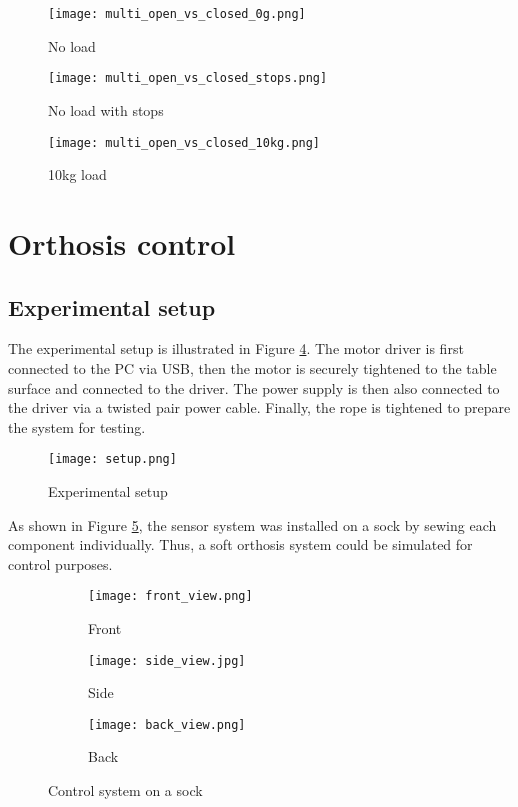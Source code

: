 \begin{figure}[htbp]
  \centering
  \texttt{[image: multi\_open\_vs\_closed\_0g.png]}
  \caption{No load}
  \label{fig:movc0g}
\end{figure}
\begin{figure}[htbp]
  \centering
  \texttt{[image: multi\_open\_vs\_closed\_stops.png]}
  \caption{No load with stops}
  \label{fig:movcstops}
\end{figure}
\begin{figure}[htbp]
  \centering
  \texttt{[image: multi\_open\_vs\_closed\_10kg.png]}
  \caption{10kg load}
  \label{fig:movc10kg}
\end{figure}
\FloatBarrier

\section{Orthosis control}
\subsection{Experimental setup}
The experimental setup is illustrated in Figure \ref{fig:setup}. The motor driver 
is first connected to the PC via USB, then the motor is securely tightened to the 
table surface and connected to the driver. The power supply is then also connected 
to the driver via a twisted pair power cable. Finally, the rope is tightened to 
prepare the system for testing.  

\begin{figure}[htbp]
  \centering
  \texttt{[image: setup.png]}
  \caption{Experimental setup}
  \label{fig:setup}
\end{figure}

As shown in Figure \ref{fig:sensor_system_sock}, the sensor system was installed on a sock by sewing 
each component individually. Thus, a soft orthosis system could be simulated 
for control purposes. 

\begin{figure}[htbp]
    \centering
    \begin{subfigure}{0.3\textwidth}
        \centering
        \texttt{[image: front\_view.png]}
        \caption{Front}
    \end{subfigure}
    \begin{subfigure}{0.3\textwidth}
        \centering
        \texttt{[image: side\_view.jpg]}
        \caption{Side}
    \end{subfigure}
    \begin{subfigure}{0.3\textwidth}
        \centering
        \texttt{[image: back\_view.png]}
        \caption{Back}
    \end{subfigure}
    \caption{
      Control system on a sock
    }
    \label{fig:sensor_system_sock}
\end{figure}

